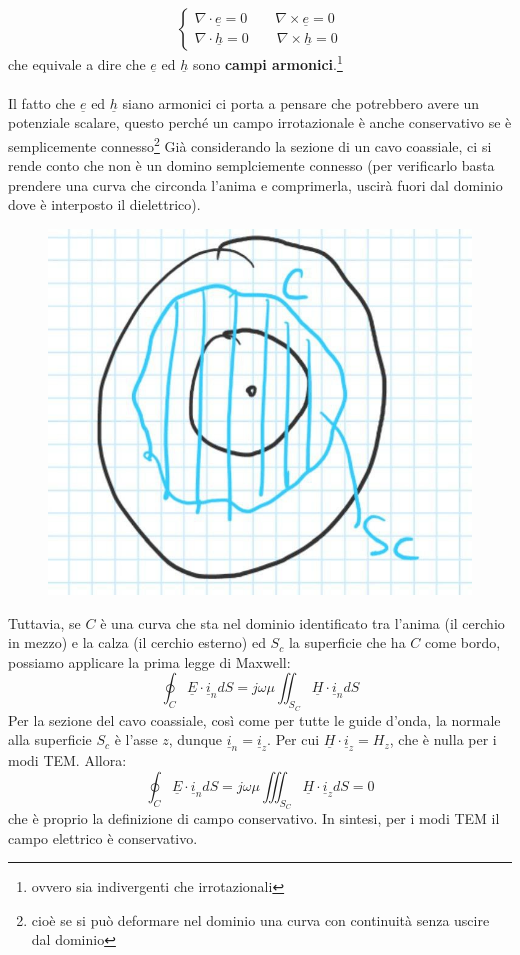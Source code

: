 \documentclass{book}
\begin{document}
    \begin{equation}
        \begin{cases}
            \nabla \cdot \underline{e} = 0 \qquad \nabla \times \underline{e} = 0
            \\ \nabla \cdot \underline{h} = 0 \qquad \nabla \times \underline{h} = 0
        \end{cases}
    \end{equation}
    che equivale a dire che $\underline{e}$ ed $\underline{h}$ sono \textbf{campi armonici}.\footnote{ovvero sia indivergenti che irrotazionali}
    \\ \\
    Il fatto che $\underline{e}$ ed $\underline{h}$ siano armonici ci porta a pensare che potrebbero avere un potenziale scalare, questo 
    perché un campo irrotazionale è anche conservativo se è semplicemente connesso\footnote{cioè se si può deformare nel dominio una curva con continuità senza uscire dal dominio}
    Già considerando la sezione di un cavo coassiale, ci si rende conto che non è un domino semplciemente connesso (per verificarlo basta prendere una curva che circonda l'anima 
    e comprimerla, uscirà fuori dal dominio dove è interposto il dielettrico).
    \newpage
    \begin{figure}[h!]
        \center 
        \includegraphics[width=0.5\linewidth]{Chapter_two/Chapt2img6.png}
    \end{figure} 
    Tuttavia, se $C$ è una curva che sta nel dominio identificato tra l'anima (il cerchio in mezzo) e la calza
    (il cerchio esterno) ed $S_{c}$ la superficie che ha $C$ come bordo, possiamo applicare la prima legge di Maxwell:
    \begin{equation}
        \oint_{C} \underline{E} \cdot \underline{i}_{n}dS = j \omega \mu \iint_{S_{C}}\underline{H}\cdot \underline{i}_{n}dS
    \end{equation}
    Per la sezione del cavo coassiale, così come per tutte le guide d'onda, la normale alla superficie $S_{c}$ è l'asse $z$, dunque $\underline{i}_{n}=\underline{i}_{z}$.
    Per cui $\underline{H} \cdot \underline{i}_{z}=H_{z}$, che è nulla per i modi TEM. Allora:
    \begin{equation}
        \oint_{C} \underline{E} \cdot \underline{i}_{n}dS = j \omega \mu \iiint_{S_{C}} \underline{H} \cdot \underline{i}_{z} dS = 0
    \end{equation}
    che è proprio la definizione di campo conservativo. In sintesi, per i modi TEM il campo elettrico è conservativo.
\end{document}
